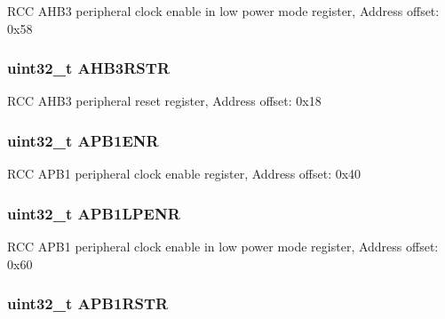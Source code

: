R\-C\-C A\-H\-B3 peripheral clock enable in low power mode register, Address offset\-: 0x58 \hypertarget{struct_r_c_c___type_def_a28560c5bfeb45326ea7f2019dba57bea}{
\subsubsection[{A\-H\-B3\-R\-S\-T\-R}]{ uint32\-\_\-t A\-H\-B3\-R\-S\-T\-R}}\label{struct_r_c_c___type_def_a28560c5bfeb45326ea7f2019dba57bea}
R\-C\-C A\-H\-B3 peripheral reset register, Address offset\-: 0x18 \hypertarget{struct_r_c_c___type_def_ac88901e2eb35079b7b58a185e6bf554c}{
\subsubsection[{A\-P\-B1\-E\-N\-R}]{ uint32\-\_\-t A\-P\-B1\-E\-N\-R}}\label{struct_r_c_c___type_def_ac88901e2eb35079b7b58a185e6bf554c}
R\-C\-C A\-P\-B1 peripheral clock enable register, Address offset\-: 0x40 \hypertarget{struct_r_c_c___type_def_ad85a9951a7be79fe08ffc90f796f071b}{
\subsubsection[{A\-P\-B1\-L\-P\-E\-N\-R}]{ uint32\-\_\-t A\-P\-B1\-L\-P\-E\-N\-R}}\label{struct_r_c_c___type_def_ad85a9951a7be79fe08ffc90f796f071b}
R\-C\-C A\-P\-B1 peripheral clock enable in low power mode register, Address offset\-: 0x60 \hypertarget{struct_r_c_c___type_def_a7da5d372374bc59e9b9af750b01d6a78}{
\subsubsection[{A\-P\-B1\-R\-S\-T\-R}]{ uint32\-\_\-t A\-P\-B1\-R\-S\-T\-R}}\label{struct_r_c_c___type_def_a7da5d372374bc59e9b9af750b01d6a78}
